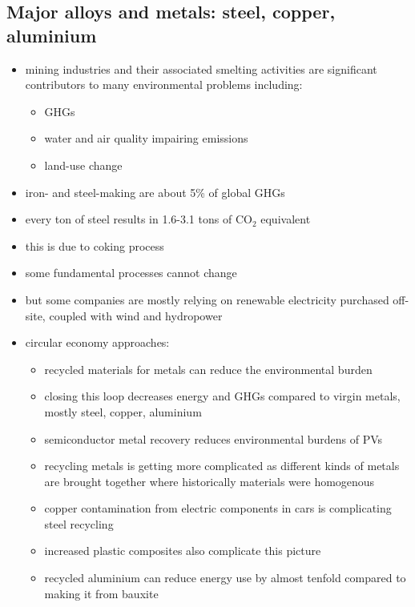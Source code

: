 \subsection{Major alloys and metals: steel, copper, aluminium}
\begin{itemize}
	\item mining industries and their associated smelting activities are
	significant contributors to many environmental problems including:
	\begin{itemize}
		\item GHGs
		\item water and air quality impairing emissions
		\item land-use change
	\end{itemize}
	\item iron- and steel-making are about 5\% of global GHGs
	\item every ton of steel results in 1.6-3.1 tons of CO$_2$ equivalent
	\item this is due to coking process
	\item some fundamental processes cannot change
	\item but some companies are mostly relying on renewable electricity
	purchased off-site, coupled with wind and hydropower
	\item circular economy approaches:
	\begin{itemize}
		\item recycled materials for metals can reduce the
		environmental burden
		\item closing this loop decreases energy and GHGs compared to
		virgin metals, mostly steel, copper, aluminium
		\item semiconductor metal recovery reduces environmental
		burdens of PVs
		\item recycling metals is getting more complicated as
		different kinds of metals are brought together where
		historically materials were homogenous
		\item copper contamination from electric components in cars
		is complicating steel recycling
		\item increased plastic composites also complicate this
		picture
		\item recycled aluminium can reduce energy use by almost
		tenfold compared to making it from bauxite
	\end{itemize}
\end{itemize}

